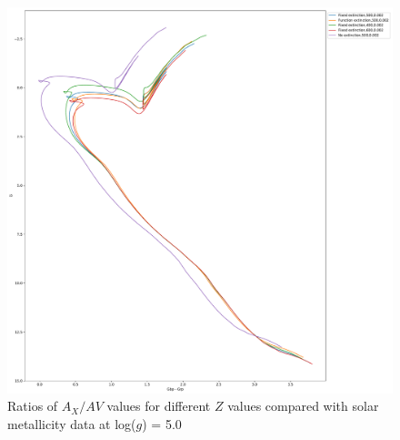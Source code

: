 \documentclass[12pt, a4paper]{report}
\begin{document}
\begin{figure}[h]
\begin{center}
\includegraphics[scale=0.3]{../basti_isochrones_10_13Gyr/Extinction_T5k_FeH0fix_func_G_GbpmGrp_500_400_600_Myr_FeH_0p002_ref_noext_Av_1p0.pdf}
\caption{Ratios of $A_{X}/A{V}$ values for different $Z$ values compared with solar metallicity data at log($g$) = 5.0}
\label{gaia_isoc_T5k}
\end{center}
\end{figure}
\end{document}
